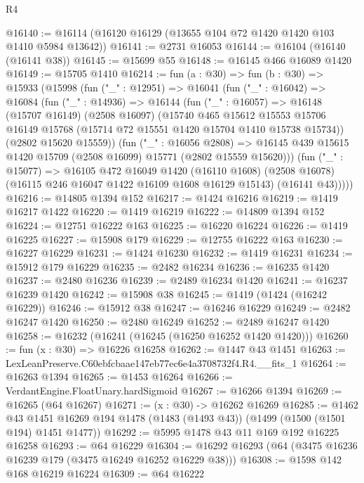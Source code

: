 \begin{lexlean}{R4}
\begin{coremodule}
@16140 := @16114 (@16120 @16129 (@13655 @104 @72 @1420 @1420 @103 @1410 @5984 @13642))
@16141 := @2731 @16053
@16144 := @16104 (@16140 (@16141 @38))
@16145 := @15699 @55
@16148 := @16145 @466 @16089 @1420
@16149 := @15705 @1410
@16214 := fun (a : @30) =>
  fun (b : @30) =>
  @15933
    (@15998
      (fun ("_" : @12951) =>
      @16041
        (fun ("_" : @16042) =>
        @16084
          (fun ("_" : @14936) =>
          @16144
            (fun ("_" : @16057) =>
            @16148
              (@15707 @16149)
              (@2508 @16097)
              (@15740
                @465
                @15612
                @15553
                @15706
                @16149
                @15768
                (@15714 @72 @15551 @1420 @15704 @1410 @15738 @15734))
              (@2802 @15620 @15559))
            (fun ("_" : @16056 @2808) =>
            @16145 @439 @15615 @1420 @15709 (@2508 @16099) @15771 (@2802 @15559 @15620)))
          (fun ("_" : @15077) =>
          @16105
            @472
            @16049
            @1420
            (@16110 @1608)
            (@2508 @16078)
            (@16115 @246 @16047 @1422 @16109 @1608 @16129 @15143)
            (@16141 @43)))))
@16216 := @14805 @1394 @152
@16217 := @1424 @16216
@16219 := @1419 @16217 @1422
@16220 := @1419 @16219
@16222 := @14809 @1394 @152
@16224 := @12751 @16222 @163
@16225 := @16220 @16224
@16226 := @1419 @16225
@16227 := @15908 @179
@16229 := @12755 @16222 @163
@16230 := @16227 @16229
@16231 := @1424 @16230
@16232 := @1419 @16231
@16234 := @15912 @179 @16229
@16235 := @2482 @16234
@16236 := @16235 @1420
@16237 := @2480 @16236
@16239 := @2489 @16234 @1420
@16241 := @16237 @16239 @1420
@16242 := @15908 @38
@16245 := @1419 (@1424 (@16242 @16229))
@16246 := @15912 @38
@16247 := @16246 @16229
@16249 := @2482 @16247 @1420
@16250 := @2480 @16249
@16252 := @2489 @16247 @1420
@16258 := @16232 (@16241 (@16245 (@16250 @16252 @1420 @1420)))
@16260 := fun (x : @30) => @16226 @16258
@16262 := @1447 @43 @1451
@16263 := LexLeanPreserve.C60ebfcbaae147eb77ec6e4a3708732f4.R4.__fits_1
@16264 := @16263 @1394
@16265 := @1453 @16264
@16266 := VerdantEngine.FloatUnary.hardSigmoid
@16267 := @16266 @1394
@16269 := @16265 (@64 @16267)
@16271 := (x : @30) -> @16262 @16269
@16285 := @1462
    @43
    @1451
    @16269
    @194
    @1478
    (@1483 (@1493 @43))
    (@1499 (@1500 (@1501 @194) @1451 @1477))
@16292 := @5995 @1478 @43 @11 @169 @192 @16225 @16258
@16293 := @64 @16229
@16304 := @16292 @16293 (@64 (@3475 @16236 @16239 @179 (@3475 @16249 @16252 @16229 @38)))
@16308 := @1598 @142 @168 @16219 @16224
@16309 := @64 @16222

\end{coremodule}
\end{lexlean}
